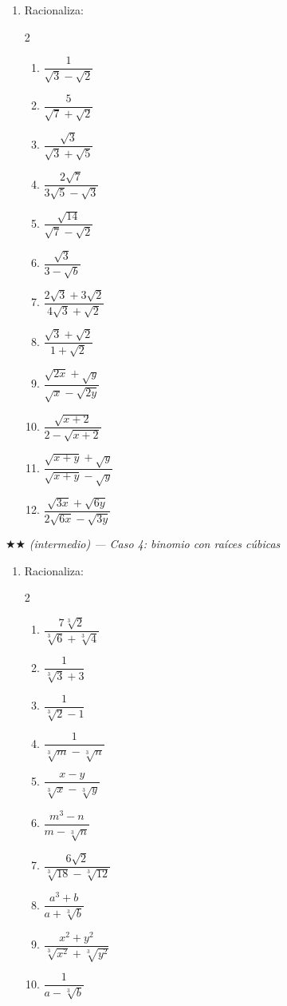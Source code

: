\documentclass[11pt, letterpaper]{article}
\begin{document}
\begin{enumerate}[label=\textbf{\arabic*.}, leftmargin=*, resume]
  \item Racionaliza:
  \begin{multicols}{2}
  \begin{enumerate}[label=\alph*)]
    \item $\dfrac{1}{\sqrt{3}-\sqrt{2}}$
    \item $\dfrac{5}{\sqrt{7}+\sqrt{2}}$
    \item $\dfrac{\sqrt{3}}{\sqrt{3}+\sqrt{5}}$
    \item $\dfrac{2\sqrt{7}}{3\sqrt{5}-\sqrt{3}}$
    \item $\dfrac{\sqrt{14}}{\sqrt{7}-\sqrt{2}}$
    \item $\dfrac{\sqrt{3}}{3-\sqrt{b}}$
    \item $\dfrac{2\sqrt{3}+3\sqrt{2}}{4\sqrt{3}+\sqrt{2}}$
    \item $\dfrac{\sqrt{3}+\sqrt{2}}{1+\sqrt{2}}$
    \item $\dfrac{\sqrt{2x}+\sqrt{y}}{\sqrt{x}-\sqrt{2y}}$
    \item $\dfrac{\sqrt{x+2}}{2-\sqrt{x+2}}$
    \item $\dfrac{\sqrt{x+y}+\sqrt{y}}{\sqrt{x+y}-\sqrt{y}}$
    \item $\dfrac{\sqrt{3x}+\sqrt{6y}}{2\sqrt{6x}-\sqrt{3y}}$
  \end{enumerate}
  \end{multicols}
\end{enumerate}

$\bigstar\bigstar$ \textit{(intermedio) — Caso 4: binomio con raíces cúbicas}

\begin{enumerate}[label=\textbf{\arabic*.}, leftmargin=*, resume]
  \item Racionaliza:
  \begin{multicols}{2}
  \begin{enumerate}[label=\alph*)]
    \item $\dfrac{7\sqrt[3]{2}}{\sqrt[3]{6}+\sqrt[3]{4}}$
    \item $\dfrac{1}{\sqrt[3]{3}+3}$
    \item $\dfrac{1}{\sqrt[3]{2}-1}$
    \item $\dfrac{1}{\sqrt[3]{m}-\sqrt[3]{n}}$
    \item $\dfrac{x-y}{\sqrt[3]{x}-\sqrt[3]{y}}$
    \item $\dfrac{m^3-n}{m-\sqrt[3]{n}}$
    \item $\dfrac{6\sqrt{2}}{\sqrt[3]{18}-\sqrt[3]{12}}$
    \item $\dfrac{a^3+b}{a+\sqrt[3]{b}}$
    \item $\dfrac{x^2+y^2}{\sqrt[3]{x^2}+\sqrt[3]{y^2}}$
    \item $\dfrac{1}{a-\sqrt[3]{b}}$
  \end{enumerate}
  \end{multicols}
\end{enumerate}
\end{document}

